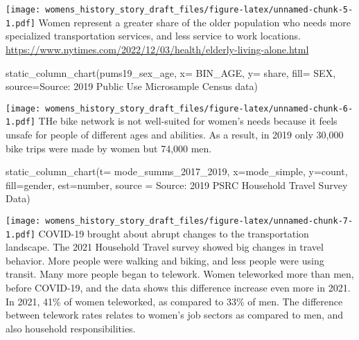 \documentclass[
  12pt,
]{article}
\newenvironment{Shaded}{\begin{snugshade}}{\end{snugshade}}
\newcommand{\AttributeTok}[1]{\textcolor[rgb]{0.77,0.63,0.00}{#1}}
\newcommand{\FunctionTok}[1]{\textcolor[rgb]{0.00,0.00,0.00}{#1}}
\newcommand{\NormalTok}[1]{#1}
\newcommand{\StringTok}[1]{\textcolor[rgb]{0.31,0.60,0.02}{#1}}
\begin{document}
\texttt{[image: womens\_history\_story\_draft\_files/figure-latex/unnamed-chunk-5-1.pdf]}
Women represent a greater share of the older population who needs more
specialized transportation services, and less service to work locations.
\url{https://www.nytimes.com/2022/12/03/health/elderly-living-alone.html}

\begin{Shaded}
\begin{Highlighting}[]
\FunctionTok{static\_column\_chart}\NormalTok{(pums19\_sex\_age, }\AttributeTok{x=} \StringTok{\textquotesingle{}BIN\_AGE\textquotesingle{}}\NormalTok{, }\AttributeTok{y=} \StringTok{\textquotesingle{}share\textquotesingle{}}\NormalTok{, }\AttributeTok{fill=} \StringTok{\textquotesingle{}SEX\textquotesingle{}}\NormalTok{, }\AttributeTok{source=}\StringTok{\textquotesingle{}Source: 2019 Public Use Microsample Census data\textquotesingle{}}\NormalTok{)}
\end{Highlighting}
\end{Shaded}

\texttt{[image: womens\_history\_story\_draft\_files/figure-latex/unnamed-chunk-6-1.pdf]}
THe bike network is not well-suited for women's needs because it feels
unsafe for people of different ages and abilities. As a result, in 2019
only 30,000 bike trips were made by women but 74,000 men.

\begin{Shaded}
\begin{Highlighting}[]
\FunctionTok{static\_column\_chart}\NormalTok{(}\AttributeTok{t=}\NormalTok{ mode\_summs\_2017\_2019, }\AttributeTok{x=}\StringTok{\textquotesingle{}mode\_simple\textquotesingle{}}\NormalTok{, }\AttributeTok{y=}\StringTok{\textquotesingle{}count\textquotesingle{}}\NormalTok{,  }\AttributeTok{fill=}\StringTok{\textquotesingle{}gender\textquotesingle{}}\NormalTok{, }\AttributeTok{est=}\StringTok{\textquotesingle{}number\textquotesingle{}}\NormalTok{, }\AttributeTok{source =} \StringTok{\textquotesingle{}Source: 2019 PSRC Household Travel Survey Data\textquotesingle{}}\NormalTok{)}
\end{Highlighting}
\end{Shaded}

\texttt{[image: womens\_history\_story\_draft\_files/figure-latex/unnamed-chunk-7-1.pdf]}
COVID-19 brought about abrupt changes to the transportation landscape.
The 2021 Household Travel survey showed big changes in travel behavior.
More people were walking and biking, and less people were using transit.
Many more people began to telework. Women teleworked more than men,
before COVID-19, and the data shows this difference increase even more
in 2021. In 2021, 41\% of women teleworked, as compared to 33\% of men.
The difference between telework rates relates to women's job sectors as
compared to men, and also household responsibilities.
\end{document}
